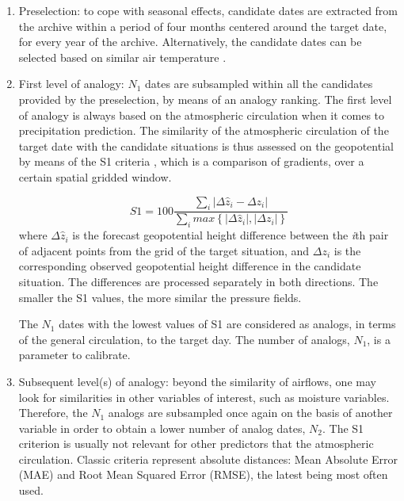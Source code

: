 \documentclass[review]{elsarticle}
\begin{document}
\begin{enumerate}
	\item Preselection: to cope with seasonal effects, candidate dates are extracted from the archive within a period of four months centered around the target date, for every year of the archive. Alternatively, the candidate dates can be selected based on similar air temperature \citep{BenDaoud2010}.
	
	\item First level of analogy: $N_{1}$ dates are subsampled within all the candidates provided by the preselection, by means of an analogy ranking. The first level of analogy is always based on the atmospheric circulation when it comes to precipitation prediction. The similarity of the atmospheric circulation of the target date with the candidate situations is thus assessed on the geopotential by means of the S1 criteria \citep[Eq. (\ref{eq:S1}), ][see also Sect. \ref{sec:method:references}]{Teweles1954, Drosdowsky2003}, which is a comparison of gradients, over a certain spatial gridded window.
	
	\begin{equation}
	\label{eq:S1}
	S1=100 \frac {\displaystyle \sum_{i} \vert \Delta\hat{z}_{i} - \Delta z_{i} \vert}
	{\displaystyle \sum_{i} max\left\lbrace \vert \Delta\hat{z}_{i} \vert , \vert \Delta z_{i} \vert \right\rbrace }
	\end{equation}
	where $\Delta \hat{z}_{i}$ is the forecast geopotential height difference between the \textit{i}th pair of adjacent points from the grid of the target situation, and $\Delta z_{i}$ is the corresponding observed geopotential height difference in the candidate situation. The differences are processed separately in both directions. The smaller the S1 values, the more similar the pressure fields.
	
	The $N_{1}$ dates with the lowest values of S1 are considered as analogs, in terms of the general circulation, to the target day. The number of analogs, $N_{1}$, is a parameter to calibrate.
	
	\item Subsequent level(s) of analogy: beyond the similarity of airflows, one may look for similarities in other variables of interest, such as moisture variables. Therefore, the $N_{1}$ analogs are subsampled once again on the basis of another variable in order to obtain a lower number of analog dates, $N_{2}$. The S1 criterion is usually not relevant for other predictors that the atmospheric circulation. Classic criteria represent absolute distances: Mean Absolute Error (MAE) and Root Mean Squared Error (RMSE), the latest being most often used.
	

\end{enumerate}
\end{document}
